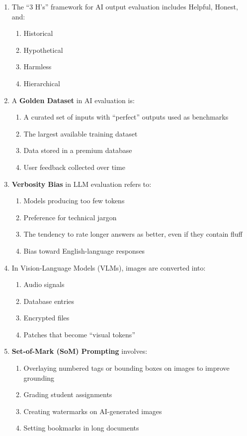 \documentclass[11pt]{article}
\begin{document}
\begin{enumerate}
\item The ``3 H's'' framework for AI output evaluation includes Helpful, Honest, and:
\begin{enumerate}[label=\Alph*)]
    \item Historical
    \item Hypothetical
    \item Harmless
    \item Hierarchical
\end{enumerate}

\item A \textbf{Golden Dataset} in AI evaluation is:
\begin{enumerate}[label=\Alph*)]
    \item A curated set of inputs with ``perfect'' outputs used as benchmarks
    \item The largest available training dataset
    \item Data stored in a premium database
    \item User feedback collected over time
\end{enumerate}

\item \textbf{Verbosity Bias} in LLM evaluation refers to:
\begin{enumerate}[label=\Alph*)]
    \item Models producing too few tokens
    \item Preference for technical jargon
    \item The tendency to rate longer answers as better, even if they contain fluff
    \item Bias toward English-language responses
\end{enumerate}

\item In Vision-Language Models (VLMs), images are converted into:
\begin{enumerate}[label=\Alph*)]
    \item Audio signals
    \item Database entries
    \item Encrypted files
    \item Patches that become ``visual tokens''
\end{enumerate}

\item \textbf{Set-of-Mark (SoM) Prompting} involves:
\begin{enumerate}[label=\Alph*)]
    \item Overlaying numbered tags or bounding boxes on images to improve grounding
    \item Grading student assignments
    \item Creating watermarks on AI-generated images
    \item Setting bookmarks in long documents
\end{enumerate}


\end{enumerate}
\end{document}

